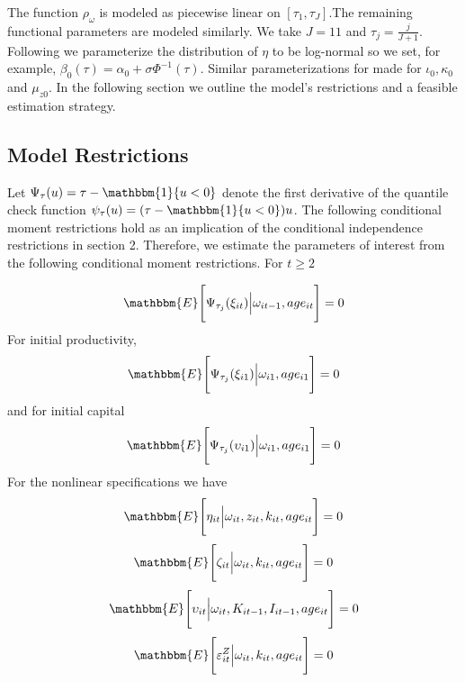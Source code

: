 \documentclass{article}
\begin{document}
The function $\rho_{\omega}$ is modeled as piecewise linear on $[\tau_{1}, \tau_{J}]$.The remaining functional parameters are modeled similarly. We take $J=11$ and $\tau_{j}=\frac{j}{J+1}$. Following \cite{Arellano2017} we parameterize the distribution of $\eta$ to be log-normal so we set, for example, $\beta_{0}(\tau)=\alpha_{0}+\sigma\Phi^{-1}(\tau)$. Similar parameterizations for made for $\iota_{0}, \kappa_{0}$ and $\mu_{z0}$.  In the following section we outline the model's restrictions and a feasible estimation strategy.

\subsection{Model Restrictions}
Let $\Psi_{\tau}(u)=\tau-\mathbbm{1}\{u<0\}$ denote the first derivative of the quantile check function $\psi_{\tau}(u)=(\tau-\mathbbm{1}\{u<0\})u$. The following conditional moment restrictions hold as an implication of the conditional independence restrictions in section 2. Therefore, we estimate the parameters of interest from the following conditional moment restrictions. For $t\geq 2$

\begin{equation}\label{omegaqmoment}
\mathbbm{E}\Bigg[\Psi_{\tau_{j}}(\xi_{it})\Big|\omega_{it-1}, age_{it}\Bigg]=0
\end{equation}
For initial productivity,
\begin{equation}\label{omega1qmoment}
\mathbbm{E}\Bigg[\Psi_{\tau_{j}}(\xi_{i1})\Big|\omega_{i1}, age_{i1}\Bigg]=0
\end{equation}
and for initial capital
\begin{equation}\label{k1qmoment}
\mathbbm{E}\Bigg[\Psi_{\tau_{j}}(\upsilon_{i1})\Big|\omega_{i1}, age_{i1}\Bigg]=0
\end{equation}
For the nonlinear specifications we have
\begin{equation}\label{yemoment}
\mathbbm{E}\Bigg[\eta_{it}\Big|\omega_{it}, z_{it}, k_{it}, age_{it}\Bigg]=0
\end{equation}
\begin{equation}\label{iemoment}
\mathbbm{E}\Bigg[\zeta_{it}\Big|\omega_{it}, k_{it}, age_{it}\Bigg]=0
\end{equation}
\begin{equation}\label{kemoment}
\mathbbm{E}\Bigg[\upsilon_{it}\Big|\omega_{it}, K_{it-1}, I_{it-1},  age_{it}\Bigg]=0
\end{equation}
\begin{equation}\label{emoment}
\mathbbm{E}\Bigg[\varepsilon^{Z}_{it}\Big|\omega_{it}, k_{it}, age_{it}\Bigg]=0
\end{equation}
\end{document}
